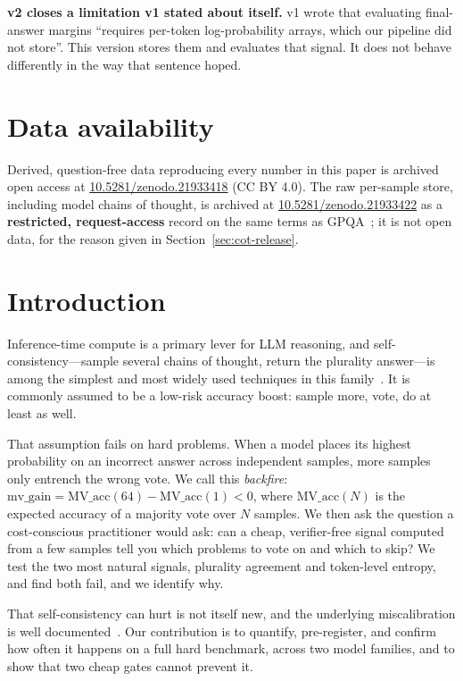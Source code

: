 \documentclass{article}
\begin{document}
\textbf{v2 closes a limitation v1 stated about itself.} v1 wrote that
evaluating final-answer margins ``requires per-token log-probability arrays,
which our pipeline did not store''. This version stores them and evaluates that
signal. It does not behave differently in the way that sentence hoped.

\section*{Data availability}

Derived, question-free data reproducing every number in this paper is archived
open access at \href{https://doi.org/10.5281/zenodo.21933418}{10.5281/zenodo.21933418} (CC BY 4.0). The raw per-sample
store, including model chains of thought, is archived at
\href{https://doi.org/10.5281/zenodo.21933422}{10.5281/zenodo.21933422} as a \textbf{restricted, request-access} record
on the same terms as GPQA~\citep{rein2023gpqa}; it is not open data, for the
reason given in Section~\ref{sec:cot-release}.

\section{Introduction}

Inference-time compute is a primary lever for LLM reasoning, and
self-consistency---sample several chains of thought, return the plurality
answer---is among the simplest and most widely used techniques in this
family~\citep{wang2023self}. It is commonly assumed to be a low-risk
accuracy boost: sample more, vote, do at least as well.

That assumption fails on hard problems. When a model places its highest
probability on an incorrect answer across independent samples, more samples
only entrench the wrong vote. We call this \emph{backfire}:
$\text{mv\_gain} = \text{MV\_acc}(64) - \text{MV\_acc}(1) < 0$, where
$\text{MV\_acc}(N)$ is the expected accuracy of a majority vote over $N$
samples. We then ask
the question a cost-conscious practitioner would ask: can a cheap,
verifier-free signal computed from a few samples tell you which problems to
vote on and which to skip? We test the two most natural signals, plurality
agreement and token-level entropy, and find both fail, and we identify why.

That self-consistency can hurt is not itself new, and the underlying
miscalibration is well documented~\citep{guo2017calibration,
kadavath2022language}. Our contribution is to quantify, pre-register, and
confirm how often it happens on a full hard benchmark, across two model
families, and to show that two cheap gates cannot prevent it.
\end{document}
